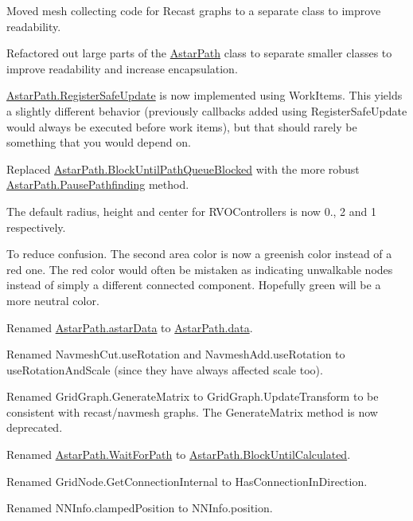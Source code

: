 \begin{DoxyItemize}
\begin{DoxyItemize}
\begin{DoxyItemize}
\item Moved mesh collecting code for Recast graphs to a separate class to improve readability.
\item Refactored out large parts of the \mbox{\hyperlink{class_astar_path}{Astar\+Path}} class to separate smaller classes to improve readability and increase encapsulation.
\item \mbox{\hyperlink{class_astar_path_a9715676ae64ec6f738c83b0c7c1ce7d7}{Astar\+Path.\+Register\+Safe\+Update}} is now implemented using Work\+Items. This yields a slightly different behavior (previously callbacks added using Register\+Safe\+Update would always be executed before work items), but that should rarely be something that you would depend on.
\item Replaced \mbox{\hyperlink{class_astar_path_ad346ba32beb7da19d030f5009d4cbb30}{Astar\+Path.\+Block\+Until\+Path\+Queue\+Blocked}} with the more robust \mbox{\hyperlink{class_astar_path_a5eb2769ea83a0171c9cd0161544b211e}{Astar\+Path.\+Pause\+Pathfinding}} method.
\item The default radius, height and center for R\+V\+O\+Controllers is now 0., 2 and 1 respectively.
\item To reduce confusion. The second area color is now a greenish color instead of a red one. The red color would often be mistaken as indicating unwalkable nodes instead of simply a different connected component. Hopefully green will be a more neutral color.
\item Renamed \mbox{\hyperlink{class_astar_path_adda93f7f7219c99635bad43f1be71b6e}{Astar\+Path.\+astar\+Data}} to \mbox{\hyperlink{class_astar_path_a862c787d58adaf4c7b87b37a0c1aea83}{Astar\+Path.\+data}}.
\item Renamed Navmesh\+Cut.\+use\+Rotation and Navmesh\+Add.\+use\+Rotation to use\+Rotation\+And\+Scale (since they have always affected scale too).
\item Renamed Grid\+Graph.\+Generate\+Matrix to Grid\+Graph.\+Update\+Transform to be consistent with recast/navmesh graphs. The Generate\+Matrix method is now deprecated.
\item Renamed \mbox{\hyperlink{class_astar_path_ac46f3c7ee27f7e587a00f549a9a7118d}{Astar\+Path.\+Wait\+For\+Path}} to \mbox{\hyperlink{class_astar_path_a57ad57cd7356a7f9217516672e0a7bc9}{Astar\+Path.\+Block\+Until\+Calculated}}.
\item Renamed Grid\+Node.\+Get\+Connection\+Internal to Has\+Connection\+In\+Direction.
\item Renamed N\+N\+Info.\+clamped\+Position to N\+N\+Info.\+position.

\end{DoxyItemize}
\end{DoxyItemize}
\end{DoxyItemize}
